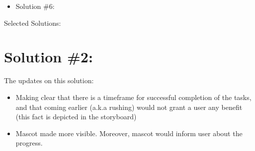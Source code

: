 \documentclass[a4paper,10pt,oneside]{scrreprt}
\begin{document}
\begin{itemize}
\begin{compactitem}[*]
		\end{compactitem}
		
	\item Solution \#6:
\end{itemize}
 
\bigskip
\bigskip
\bigskip
\bigskip
Selected Solutions:\\

\section{Solution \#2:}
The updates on this solution:
\begin{itemize}
	\item Making clear that there is a timeframe for successful completion of the tasks, and that coming earlier (a.k.a rushing) would not grant a user any benefit (this fact is depicted in the storyboard)
	\item Mascot made more visible. Moreover, mascot would inform user about the progress.

\end{itemize}
\end{document}
